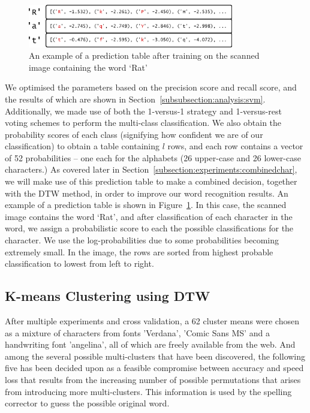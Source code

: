 \documentclass[12pt]{article}
\begin{document}
		\begin{figure}[htbp!]
		\centering
		\includegraphics[width=0.8\textwidth]{svm_table.eps}
		\caption{An example of a prediction table after training on the scanned image containing the word `Rat'}
		\label{figure:svm_table}
		\end{figure}

		We optimised the parameters based on the precision score and recall score, and the results of which are shown in Section~\ref{subsubsection:analysis:svm}. Additionally, we made use of both the 1-versus-1 strategy and 1-versus-rest voting schemes to perform the multi-class classification. We also obtain the probability scores of each class (signifying how confident we are of our classification) to obtain a table containing $l$ rows, and each row contains a vector of 52 probabilities -- one each for the alphabets (26 upper-case and 26 lower-case characters.) As covered later in Section~\ref{subsection:experiments:combinedchar}, we will make use of this prediction table to make a combined decision, together with the DTW method, in order to improve our word recognition results. An example of a prediction table is shown in Figure~\ref{figure:svm_table}. In this case, the scanned image contains the word `Rat', and after classification of each character in the word, we assign a probabilistic score to each the possible classifications for the character. We use the log-probabilities due to some probabilities becoming extremely small. In the image, the rows are sorted from highest probable classification to lowest from left to right.

	
	\subsection{K-means Clustering using DTW}
	\label{subsection:experiments:dtw}
	
	After multiple experiments and cross validation, a 62 cluster means were chosen as a mixture of characters from fonts 'Verdana', 'Comic Sans MS' and a handwriting font 'angelina', all of which are freely available from the web. And among the several possible multi-clusters that have been discovered, the following five has been decided upon as a feasible compromise between accuracy and speed loss that results from the increasing number of possible permutations that arises from introducing more multi-clusters. This information is used by the spelling corrector to guess the possible original word.
	
\end{document}
